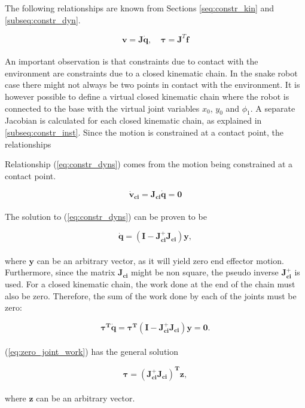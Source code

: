 The following relationships are known from Sections \ref{seq:constr_kin} and \ref{subseq:constr_dyn}. 

\begin{equation}
	\mathbf{v = J \dot{q}} \textrm{,} \quad  \  \boldsymbol{\tau} \mathbf{= J}^T \mathbf{f}
\end{equation}
\\
An important observation is that constraints due to contact with the environment are constraints due to a closed kinematic chain. In the snake robot case there might not always be two points in contact with the environment. It is however possible to define a virtual closed kinematic chain where the robot is connected to the base with the virtual joint variables $x_0$, $y_0$ and $\phi_1$.
A separate Jacobian is calculated for each closed kinematic chain, as explained in \ref{subseq:constr_inst}.
Since the motion is constrained at a contact point, the relationships

Relationship (\ref{eq:constr_dyns}) comes from the motion being constrained at a contact point.

\begin{equation} \label{eq:constr_dyns}
    \mathbf{\dot{v}_{ci} = J_{ci} \dot{q} = 0}
\end{equation}
\\
The solution to (\ref{eq:constr_dyns}) can be proven to be

\begin{equation}
    \mathbf{\dot{q} = (I - J_{ci}^+ J_{ci}) y},
\end{equation}
\\
where $\mathbf{y}$ can be an arbitrary vector, as it will yield zero end effector motion. Furthermore, since the matrix $\mathbf{J_{ci}}$ might be non square, the pseudo inverse $\mathbf{J_{ci}^+}$ is used.
For a closed kinematic chain, the work done at the end of the chain must also be zero. Therefore, the sum of the work done by each of the joints must be zero:

\begin{equation} \label{eq:zero_joint_work}
    \boldsymbol{\tau^T} \mathbf{\dot{q}} = \boldsymbol{\tau^T} \mathbf{(I - J_{ci}^+ J_{ci}) y = 0}.
\end{equation}
\\
(\ref{eq:zero_joint_work}) has the general solution

\begin{equation}
   \boldsymbol{\tau}  \mathbf{= (J_{ci}^+ J_{ci})^T z},
\end{equation}
\\
where $\mathbf{z}$ can be an arbitrary vector.

